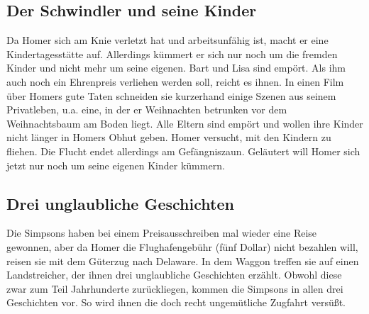 	
\subsection{Der Schwindler und seine Kinder}
Da Homer sich am Knie verletzt hat und arbeitsunfähig ist, macht er eine Kindertagesstätte auf. Allerdings kümmert er sich nur noch um die fremden Kinder und nicht mehr um seine eigenen. Bart und Lisa sind empört. Als ihm auch noch ein Ehrenpreis verliehen werden soll, reicht es ihnen. In einen Film über Homers gute Taten schneiden sie kurzerhand einige Szenen aus seinem Privatleben, u.a. eine, in der er Weihnachten betrunken vor dem Weihnachtsbaum am Boden liegt. Alle Eltern sind empört und wollen ihre Kinder nicht länger in Homers Obhut geben. Homer versucht, mit den Kindern zu fliehen. Die Flucht endet allerdings am Gefängniszaun. Geläutert will Homer sich jetzt nur noch um seine eigenen Kinder kümmern.


\subsection{Drei unglaubliche Geschichten}
Die Simpsons haben bei einem Preisausschreiben mal wieder eine Reise gewonnen, aber da Homer die Flughafengebühr (fünf Dollar) nicht bezahlen will, reisen sie mit dem Güterzug nach Delaware. In dem Waggon treffen sie auf einen Landstreicher, der ihnen drei unglaubliche Geschichten erzählt. Obwohl diese zwar zum Teil Jahrhunderte zurückliegen, kommen die Simpsons in allen drei Geschichten vor. So wird ihnen die doch recht ungemütliche Zugfahrt versüßt.

